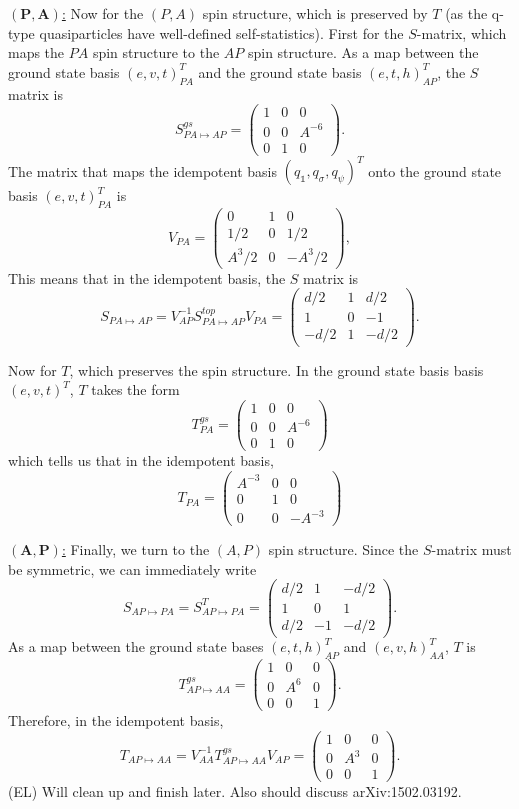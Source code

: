 \documentclass[12pt,a4paper]{article}
\newcommand{\unit}{\mathds{1}}
\newcommand\be            {\begin{equation}}
\newcommand\ee            {\end{equation}}
\newcommand{\ethan}[1]{{\color{amethyst}\footnotesize{(EL) #1}}}
\begin{document}
\underline{$\mathbf{(P,A)}$:} Now for the $(P,A)$ spin structure, which is preserved by $T$ (as the q-type quasiparticles have well-defined self-statistics). First for the $S$-matrix, which maps the $PA$ spin structure to the $AP$ spin structure. As a map between the ground state basis $(e,v,t)_{PA}^T$ and the ground state basis $(e,t,h)_{AP}^T$, the $S$ matrix is
\be S^{gs}_{PA\mapsto AP} = \begin{pmatrix}
1 & 0& 0 \\ 0 & 0 & A^{-6} \\ 0&1& 0
\end{pmatrix}.\ee
The matrix that maps the idempotent basis $(q_\unit,q_\sigma,q_\psi)^T$ onto the ground state basis $(e,v,t)_{PA}^T$ is 
\be V_{PA} = \begin{pmatrix}
0 & 1 & 0 \\ 1/2 & 0 & 1/2 \\ A^3/2 & 0 & -A^3/2
\end{pmatrix},\ee
This means that in the idempotent basis, the $S$ matrix is 
\be S_{PA \mapsto AP} = V_{AP}^{-1} S^{top}_{PA \mapsto AP} V_{PA} = \begin{pmatrix}
d/2 & 1 & d/2 \\ 1 & 0 & -1 \\ -d/2 & 1 & -d/2
\end{pmatrix}.\ee

Now for $T$, which preserves the spin structure. In the ground state basis basis $(e,v,t)^T$, $T$ takes the form 
\be T^{gs}_{PA} = \begin{pmatrix}
1 & 0 & 0\\ 0 & 0 & A^{-6} \\ 0&1&0 
\end{pmatrix}\ee
which tells us that in the idempotent basis, 
\be T_{PA}  = \begin{pmatrix}
A^{-3} & 0 & 0 \\ 0 & 1 & 0 \\ 0 & 0 & -A^{-3}
\end{pmatrix}\ee

\underline{$\mathbf{(A,P)}$:} Finally, we turn to the $(A,P)$ spin structure. 
Since the $S$-matrix must be symmetric, we can immediately write 
\be S_{AP \mapsto PA} =  S_{AP \mapsto PA}^T = \begin{pmatrix}
d/2 & 1 & -d/2 \\ 1 & 0 & 1 \\ d/2 & -1 & -d/2
\end{pmatrix}.\ee
As a map between the ground state bases $(e,t,h)^T_{AP}$ and $(e,v,h)^T_{AA}$, $T$ is 
\be T^{gs}_{AP \mapsto AA} = \begin{pmatrix}
1 &0&0 \\ 0&A^6 &0\\0&0&1
\end{pmatrix}.\ee
Therefore, in the idempotent basis, 
\be T_{AP\mapsto AA} = V_{AA}^{-1} T^{gs}_{AP\mapsto AA} V_{AP} = \begin{pmatrix}
1 &0&0 \\ 0&A^3&0\\0&0&1
\end{pmatrix}.\ee
\ethan{Will clean up and finish later. Also should discuss arXiv:1502.03192}. 
\end{document}
